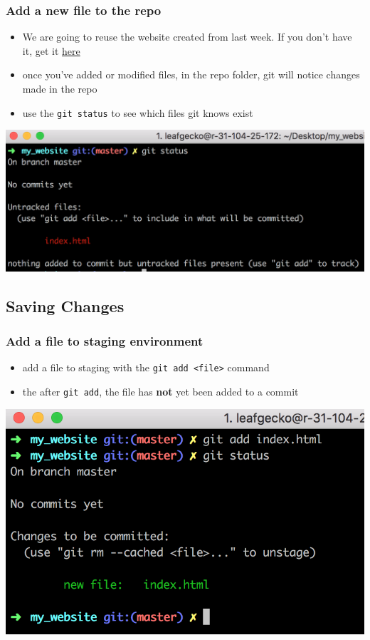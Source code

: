 \documentclass[12pt]{beamer}
\begin{document}
\begin{frame}
\frametitle{Add a new file to the repo}
\begin{itemize}
\item We are going to reuse the website created from last week. If you don't have it, get it \href{https://pastebin.com/raw/32W4Ct7k}{here}
\item once you've added or modified files, in the repo folder, git will notice changes made in the repo
\item use the \texttt{git status} to see which files git knows exist
\end{itemize}
\begin{center}
\includegraphics[width=0.5\linewidth]{git_status}
\end{center}
\end{frame}


\subsection{Saving Changes}
\begin{frame}
\frametitle{Add a file to staging environment}

\begin{itemize}
	\item add a file to staging with the \texttt{git add <file>} command
	\item the after \texttt{git add}, the file has \textbf{not} yet been added to a commit
\end{itemize}
\begin{center}
	\includegraphics[width=0.7\linewidth]{git_add_screenshot}
\end{center}
\end{frame}
\end{document}
